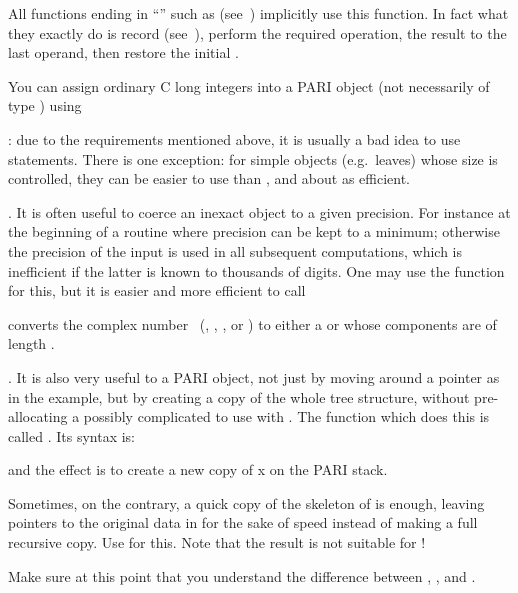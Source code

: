 All functions ending in ``'' such as 
(see~) implicitly use this function. In fact what they
exactly do is record {} (see~), perform the
required operation,  the result to the last operand, then
restore the initial .

You can assign ordinary C long integers into a PARI object (not necessarily
of type ) using


: due to the requirements mentioned above, it is usually
a bad idea to use  statements. There is one exception: for simple
objects (e.g.~leaves) whose size is controlled, they can be easier to use than
, and about as efficient.

. It is often useful to coerce an inexact object to a
given precision. For instance at the beginning of a routine where precision
can be kept to a minimum; otherwise the precision of the input is used in all
subsequent computations, which is inefficient if the latter is known to
thousands of digits. One may use the  function for this, but it
is easier and more efficient to call

 converts the complex number~
(, , ,  or ) to either
a  or  whose components are  of length
.

. It is also very useful to  a PARI object, not
just by moving around a pointer as in the  example, but by
creating a copy of the whole tree structure, without pre-allocating a
possibly complicated  to use with . The function which
does this is called . Its syntax is:


\noindent and the effect is to create a new copy of x on the PARI stack.

Sometimes, on the contrary, a quick copy of the skeleton of  is
enough, leaving pointers to the original data in  for the sake of
speed instead of making a full recursive copy. Use
 for this. Note that the result is not suitable
for  !

Make sure at this point that you understand the difference between , ,  and .

